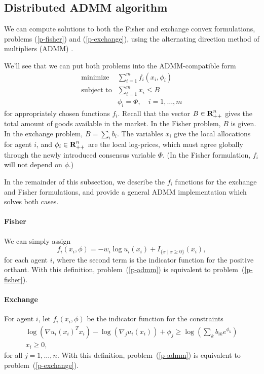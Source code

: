\documentclass[12pt]{article}
\begin{document}
\subsection{Distributed ADMM algorithm}
\label{sec:distributed}

We can compute solutions to both the Fisher and exchange convex
formulations, problems (\ref{p-fisher}) and (\ref{p-exchange}), using
the alternating direction method of multipliers (ADMM) \cite{boyd2011distributed, parikh2013proximal}.

We'll see that we can put both problems into the ADMM-compatible form
\begin{equation}
\label{p-admm}
\begin{array}{ll}
\mbox{minimize} & \sum_{i=1}^m f_i(x_i, \phi_i) \\
\mbox{subject to} & \sum_{i=1}^m x_i \leq B\\
& \phi_i = \Phi, \quad i=1,\ldots,m
\end{array}
\end{equation}
for appropriately chosen functions $f_i$.
Recall that the vector $B \in {\mbox{\bf R}}^n_{++}$ gives the total
amount of goods available in the market. In the Fisher problem,
$B$ is given.
In the exchange problem, $B = \sum_i b_i$.
The variables $x_i$ give the local allocations for agent $i$, and
$\phi_i \in {\mbox{\bf R}}^n_{++}$
are the local log-prices, which must agree globally through the newly introduced
consensus variable $\Phi$.
(In the Fisher formulation, $f_i$ will not depend on $\phi$.)

In the remainder of this subsection, we describe the $f_i$ functions for the exchange and Fisher formulations, and provide a general
ADMM implementation which solves both cases.

\paragraph{Fisher}
We can simply assign
\[
f_i(x_i, \phi) = -w_i \log u_i(x_i) + I_{\lbrace x \mid x \geq 0 \rbrace}(x_i),
\]
for each agent $i$,
where the second term is the indicator function for the positive orthant.
With this definition, problem~(\ref{p-admm}) is equivalent to
problem~(\ref{p-fisher}).

\paragraph{Exchange}

For agent $i$, let $f_i(x_i, \phi)$ be the indicator function for the
constraints
\[
\begin{array}{c}
\log(\nabla u_i(x_i)^T x_i) - \log(\nabla_j u_i(x_i)) + \phi_j \geq  \log\left(\sum_k b_{ik} e^{\phi_{k}}\right)\\
x_i \geq 0,
\end{array}
\]
for all $j=1,\ldots,n$.
With this definition, problem~(\ref{p-admm}) is equivalent to problem~(\ref{p-exchange}).
\end{document}
